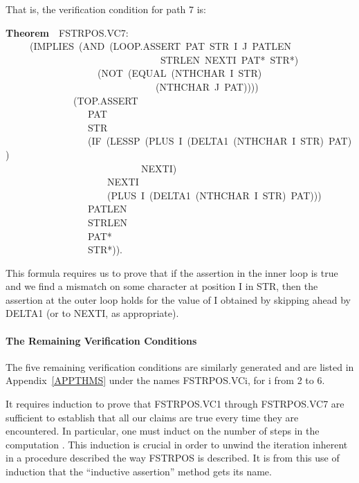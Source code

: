 \documentclass[10pt]{book}
\newenvironment{pubasis}{\begin{flushleft}}{\end{flushleft}}
\newcommand{\axiomordefinition}[1]{\vspace{6pt}\Large\textsf{\textbf{#1}}\normalsize}
\begin{document}
That is, the verification condition for path 7 is:
\begin{pubasis}
\axiomordefinition{Theorem}~~FSTRPOS.VC7:\\
~~~~~(IMPLIES~(AND~(LOOP.ASSERT~PAT~STR~I~J~PATLEN\\
~~~~~~~~~~~~~~~~~~~~~~~~~~~~~~~~STRLEN~NEXTI~PAT*~STR*)\\
~~~~~~~~~~~~~~~~~~~(NOT~(EQUAL~(NTHCHAR~I~STR)\\
~~~~~~~~~~~~~~~~~~~~~~~~~~~~~~~(NTHCHAR~J~PAT))))\\
~~~~~~~~~~~~~~(TOP.ASSERT\\
~~~~~~~~~~~~~~~~~PAT\\
~~~~~~~~~~~~~~~~~STR\\
~~~~~~~~~~~~~~~~~(IF~(LESSP~(PLUS~I~(DELTA1~(NTHCHAR~I~STR)~PAT))\\
~~~~~~~~~~~~~~~~~~~~~~~~~~~~NEXTI)\\
~~~~~~~~~~~~~~~~~~~~~NEXTI\\
~~~~~~~~~~~~~~~~~~~~~(PLUS~I~(DELTA1~(NTHCHAR~I~STR)~PAT)))\\
~~~~~~~~~~~~~~~~~PATLEN\\
~~~~~~~~~~~~~~~~~STRLEN\\
~~~~~~~~~~~~~~~~~PAT*\\
~~~~~~~~~~~~~~~~~STR*)).\\
\end{pubasis}
This formula requires us to prove that if the assertion in the
inner loop is true and we find a mismatch on some character at position
I in STR, then the assertion at the outer loop holds for the value of
I obtained by skipping ahead by DELTA1 (or to NEXTI, as appropriate).

\paragraph{The Remaining Verification Conditions}
The five remaining verification conditions are similarly generated and
are listed in Appendix~\ref{APPTHMS} under the names FSTRPOS.VCi, for i from 2 to 6.

It requires induction to prove that
FSTRPOS.VC1 through FSTRPOS.VC7 are sufficient to
establish that all our claims are true every time they are encountered.
In particular, one must induct on the number of
steps in the computation \cite{FLOYD}.  This induction is crucial in order to unwind
the iteration inherent in a procedure described the way FSTRPOS is described.
It is from this use of induction that the ``inductive assertion''
method gets its name.
\end{document}
